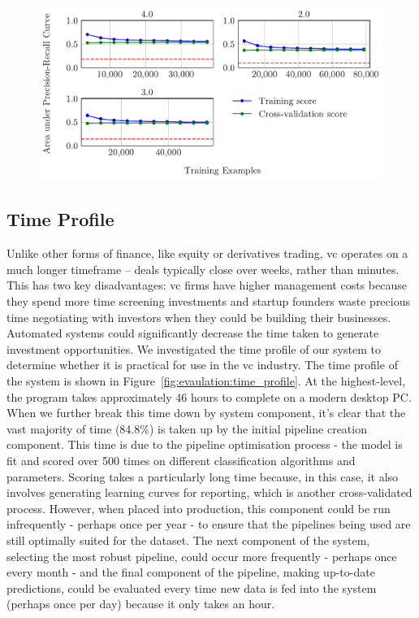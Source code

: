 \documentclass[../thesis/thesis.tex]{subfiles}
\begin{document}
\begin{figure}[!htb] %
    \centering
    \includegraphics[width=\textwidth]{../figures/evaluation/efficiency_learning_curve}
    \caption[Learning curve]{}
    \label{fig:evaluation:efficiency_learning_curve}
\end{figure}

\subsection{Time Profile}

Unlike other forms of finance, like equity or derivatives trading, \gls{vc} operates on a much longer timeframe -- deals typically close over weeks, rather than minutes. This has two key disadvantages: \gls{vc} firms have higher management costs because they spend more time screening investments and startup founders waste precious time negotiating with investors when they could be building their businesses. Automated systems could significantly decrease the time taken to generate investment opportunities. We investigated the time profile of our system to determine whether it is practical for use in the \gls{vc} industry. The time profile of the system is shown in Figure~\ref{fig:evaulation:time_profile}. At the highest-level, the program takes approximately 46 hours to complete on a modern desktop PC. When we further break this time down by system component, it's clear that the vast majority of time (84.8\%) is taken up by the initial pipeline creation component. This time is due to the pipeline optimisation process - the model is fit and scored over 500 times on different classification algorithms and parameters. Scoring takes a particularly long time because, in this case, it also involves generating learning curves for reporting, which is another cross-validated process. However, when placed into production, this component could be run infrequently - perhaps once per year - to ensure that the pipelines being used are still optimally suited for the dataset. The next component of the system, selecting the most robust pipeline, could occur more frequently - perhaps once every month - and the final component of the pipeline, making up-to-date predictions, could be evaluated every time new data is fed into the system (perhaps once per day) because it only takes an hour.
\end{document}
